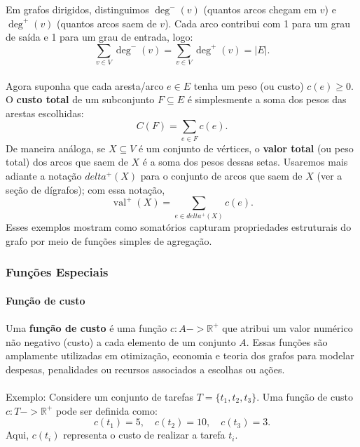 \documentclass[12pt,a4paper]{article}
\def\emph#1{#1}%
\def\to{->}%
\def\delta{delta}%
\begin{document}
Em grafos dirigidos, distinguimos \(\deg^{-}(v)\) (quantos arcos \emph{chegam} em \(v\)) e \(\deg^{+}(v)\) (quantos arcos \emph{saem} de \(v\)). Cada arco contribui com 1 para um grau de saída e 1 para um grau de entrada, logo:
\[\sum_{v\in V} \deg^{-}(v) = \sum_{v\in V} \deg^{+}(v) = |E|.\]

\paragraph{}
Agora suponha que cada aresta/arco \(e\in E\) tenha um \emph{peso} (ou \emph{custo}) \(c(e)\ge 0\). O \textbf{custo total} de um subconjunto \(F\subseteq E\) é simplesmente a soma dos pesos das arestas escolhidas:
\[C(F) = \sum_{e\in F} c(e).\]
De maneira análoga, se \(X\subseteq V\) é um conjunto de vértices, o \textbf{valor total} (ou peso total) dos arcos que \emph{saem} de \(X\) é a soma dos pesos dessas setas. Usaremos mais adiante a notação \(\delta^{+}(X)\) para o conjunto de arcos que saem de \(X\) (ver a seção de dígrafos); com essa notação,
\[\operatorname{val}^+(X) = \sum_{e\in \delta^{+}(X)} c(e).\]
Esses exemplos mostram como somatórios capturam propriedades estruturais do grafo por meio de funções simples de agregação.

\subsubsection{Funções Especiais}

\paragraph{Função de custo}
\paragraph{}Uma \textbf{função de custo} é uma função \(c: A \to \mathbb{R}^+\) que atribui um valor numérico não negativo (custo) a cada elemento de um conjunto \(A\). Essas funções são amplamente utilizadas em otimização, economia e teoria dos grafos para modelar despesas, penalidades ou recursos associados a escolhas ou ações.

\paragraph{}
Exemplo: Considere um conjunto de tarefas \(T = \{t_1, t_2, t_3\}\). Uma função de custo \(c: T \to \mathbb{R}^+\) pode ser definida como:
\[c(t_1) = 5, \quad c(t_2) = 10, \quad c(t_3) = 3.\]
Aqui, \(c(t_i)\) representa o custo de realizar a tarefa \(t_i\).
\end{document}
